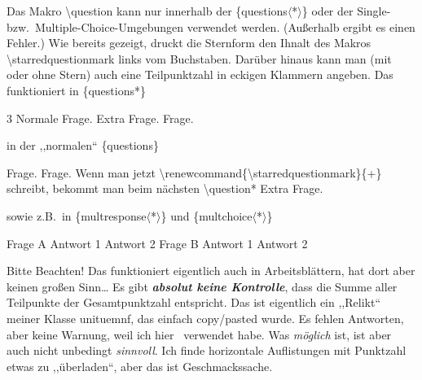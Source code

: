 \documentclass[hyperworksheet,pgfplots]{drcschool}
\newcommand*{\cs}[1]{\textup{\ttfamily\textbackslash#1}}                   %
\newcommand*{\str}[1]{\textup{\ttfamily\string#1}}                         %
\newcommand*{\pkg}[1]{\textup{\ttfamily#1}}                                %
\newcommand*{\env}[1]{\textup{\ttfamily\{#1\}}}                            %
\newcommand*{\optstar}{\mbox{\ttfamily$\langle$*$\rangle$}}                %
\begin{document}
\begin{test}[2,M,class=9a,date=32.\ Oktober 2022,v=A,ptspre=>,ptspost=<,logo=example-image]
\exercise[2]
Das Makro \cs{question} kann nur innerhalb der \env{questions\optstar}
oder der Single- bzw.~Multiple-Choice-Umgebungen verwendet werden.
(Außerhalb ergibt es einen Fehler.) Wie bereits gezeigt, druckt die
Sternform den Ihnalt des Makros \cs{starredquestionmark}
links vom Buchstaben. Darüber hinaus kann man (mit oder ohne Stern)
auch eine Teilpunktzahl in eckigen Klammern angeben. Das funktioniert in
\env{questions*}
\begin{questions*}{3}
\question Normale Frage.
\question* Extra Frage.
\question[1] Frage.
\end{questions*}
in der ,,normalen`` \env{questions}
\begin{questions}
\question[0,5] Frage.
\question[2] Frage. Wenn man jetzt \cs{renewcommand\{\textbackslash starredquestionmark\}\{+\}} schreibt,
bekommt man beim nächsten \cs{question*}\renewcommand*{\starredquestionmark}{+}
\question*[1,5] Extra Frage.
\end{questions}
sowie z.B.~in \env{multresponse\optstar} und  \env{multchoice\optstar}
\begin{multresponse}
\question*[1] Frage A
\choice Antwort 1
\choice* Antwort 2
\question Frage B
\choice* Antwort 1
\choice* Antwort 2
\end{multresponse}
\begin{solution}
\answer Bitte Beachten!
\answer Das funktioniert eigentlich auch in Arbeitsblättern, hat dort aber keinen großen Sinn\ldots
\answer Es gibt {\itshape\bfseries absolut keine Kontrolle}, dass die Summe aller Teilpunkte der Gesamtpunktzahl entspricht.
\answer Das ist eigentlich ein ,,Relikt`` meiner Klasse \pkg{unituemnf}, das einfach copy/pasted wurde.
\answer Es fehlen Antworten, aber keine Warnung, weil ich hier \NoCheck\str\NoCheck\ verwendet habe.
\answer Was \emph{möglich} ist, ist aber auch nicht unbedingt \emph{sinnvoll}. Ich finde
horizontale Auf{}listungen mit Punktzahl etwas zu ,,überladen``, aber das ist Geschmackssache.
\end{solution}
\end{test}
\end{document}
